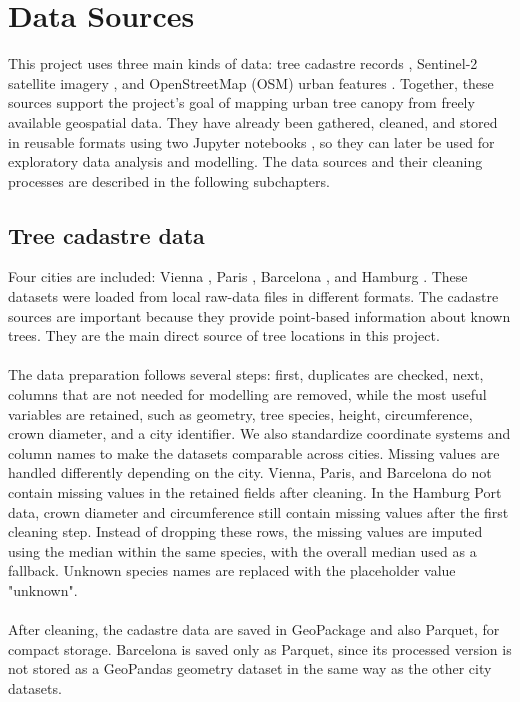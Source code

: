 \section{Data Sources}

This project uses three main kinds of data: tree cadastre records \cite{baumkataster2025} \cite{parisarbres} \cite{barcelonaarbrat} \cite{hamburgbaumkataster}, Sentinel-2 satellite imagery \cite{earthenginecodeeditor}, and OpenStreetMap (OSM) urban features \cite{geofabrikeurope}. Together, these sources support the project’s goal of mapping urban tree canopy from freely available geospatial data. They have already been gathered, cleaned, and stored in reusable formats using two Jupyter notebooks \cite{scraperbaumkataster} \cite{scrapersentinelosmnotebook}, so they can later be used for exploratory data analysis and modelling. The data sources and their cleaning processes are described in the following subchapters.

\subsection{Tree cadastre data}

Four cities are included: Vienna \cite{baumkataster2025}, Paris \cite{parisarbres}, Barcelona \cite{barcelonaarbrat}, and Hamburg \cite{hamburgbaumkataster}. These datasets were loaded from local raw-data files in different formats. The cadastre sources are important because they provide point-based information about known trees. They are the main direct source of tree locations in this project.\\
\\
The data preparation follows several steps: first, duplicates are checked, next, columns that are not needed for modelling are removed, while the most useful variables are retained, such as geometry, tree species, height, circumference, crown diameter, and a city identifier. We also standardize coordinate systems and column names to make the datasets comparable across cities. Missing values are handled differently depending on the city. Vienna, Paris, and Barcelona do not contain missing values in the retained fields after cleaning. In the Hamburg Port data, crown diameter and circumference still contain missing values after the first cleaning step. Instead of dropping these rows, the missing values are imputed using the median within the same species, with the overall median used as a fallback. Unknown species names are replaced with the placeholder value "unknown".\\
\\
After cleaning, the cadastre data are saved in GeoPackage and also Parquet, for compact storage. Barcelona is saved only as Parquet, since its processed version is not stored as a GeoPandas geometry dataset in the same way as the other city datasets.

